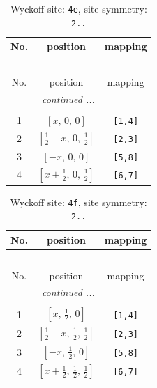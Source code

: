 \documentclass[fleqn,8pt]{jsarticle}
\begin{document}
\begin{longtable}{ccc}
\caption{Wyckoff site: {\tt 4e}, site symmetry: {\tt 2..}}
 \\
 \hline \hline
No. & position & mapping \\ \hline \endfirsthead

\multicolumn{2}{l}{\tablename\ \thetable{}} \\
 \hline \hline
No. & position & mapping \\ \hline \endhead

 \hline \hline
\multicolumn{2}{r}{\footnotesize\it continued ...} \\ \endfoot

 \hline \hline
\multicolumn{2}{r}{} \\ \endlastfoot

1 & $\left[ x,\, 0,\, 0 \right]$ & {\tt [1,4]} \\ \hline
2 & $\left[ \frac{1}{2} - x,\, 0,\, \frac{1}{2} \right]$ & {\tt [2,3]} \\ \hline
3 & $\left[ - x,\, 0,\, 0 \right]$ & {\tt [5,8]} \\ \hline
4 & $\left[ x + \frac{1}{2},\, 0,\, \frac{1}{2} \right]$ & {\tt [6,7]} \\
\end{longtable}
\renewcommand{\arraystretch}{1.2}
\begin{longtable}{ccc}
\caption{Wyckoff site: {\tt 4f}, site symmetry: {\tt 2..}}
 \\
 \hline \hline
No. & position & mapping \\ \hline \endfirsthead

\multicolumn{2}{l}{\tablename\ \thetable{}} \\
 \hline \hline
No. & position & mapping \\ \hline \endhead

 \hline \hline
\multicolumn{2}{r}{\footnotesize\it continued ...} \\ \endfoot

 \hline \hline
\multicolumn{2}{r}{} \\ \endlastfoot

1 & $\left[ x,\, \frac{1}{2},\, 0 \right]$ & {\tt [1,4]} \\ \hline
2 & $\left[ \frac{1}{2} - x,\, \frac{1}{2},\, \frac{1}{2} \right]$ & {\tt [2,3]} \\ \hline
3 & $\left[ - x,\, \frac{1}{2},\, 0 \right]$ & {\tt [5,8]} \\ \hline
4 & $\left[ x + \frac{1}{2},\, \frac{1}{2},\, \frac{1}{2} \right]$ & {\tt [6,7]} \\
\end{longtable}
\end{document}
